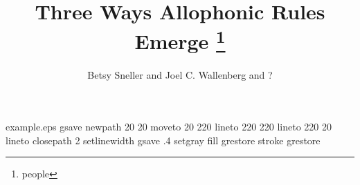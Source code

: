 %
%
%
%
%
\begin{filecontents*}{example.eps}
gsave
newpath
  20 20 moveto
  20 220 lineto
  220 220 lineto
  220 20 lineto
closepath
2 setlinewidth
gsave
  .4 setgray fill
grestore
stroke
grestore
\end{filecontents*}
%
\RequirePackage{fix-cm}
%
\documentclass{svjour3}                     %
%
\smartqed  %
%
\usepackage{mhsetup}
\usepackage{amsmath}
\usepackage{mathtools}
\usepackage{natbib}
\usepackage{graphicx}
\usepackage{float}
\usepackage{qtree}
\usepackage[utf8]{inputenc}
\usepackage{gb4e}
\usepackage[T1]{fontenc}
\usepackage{ tipa }
\newcommand{\noteme}[1]{\noindent \textbf{[[JCW:  #1 ]]}}
\renewcommand{\theequation}{\Alph{equation}}




\title{Three Ways Allophonic Rules Emerge
\thanks{people}}


\author{Betsy Sneller and Joel C. Wallenberg and ?}



